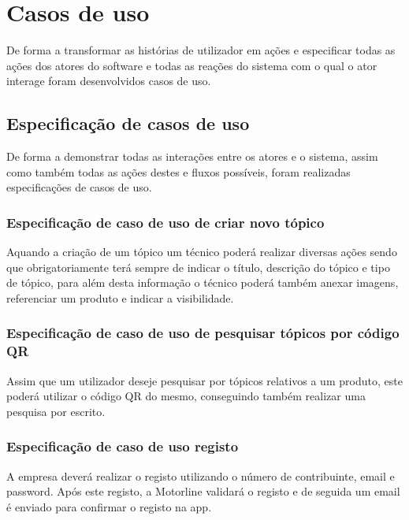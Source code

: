 \section{Casos de uso}
De forma a transformar as histórias de utilizador em ações e especificar todas as ações dos atores do 
software e todas as reações do sistema com o qual o ator interage foram desenvolvidos casos de uso.


\newpage

\subsection{Especificação de casos de uso}

De forma a demonstrar todas as interações entre os atores e o sistema, assim como também todas as ações 
destes e fluxos possíveis, foram realizadas especificações de casos de uso.

\subsubsection{Especificação de caso de uso de criar novo tópico}

Aquando a criação de um tópico um técnico poderá realizar diversas ações sendo que obrigatoriamente 
terá sempre de indicar o título, descrição do tópico e tipo de tópico, para além desta informação o técnico poderá também
anexar imagens, referenciar um produto e indicar a visibilidade.



\subsubsection{Especificação de caso de uso de pesquisar tópicos por código QR}

Assim que um utilizador deseje pesquisar por tópicos relativos a um produto, este poderá utilizar 
o código QR do mesmo, conseguindo também realizar uma pesquisa por escrito.    



\subsubsection{Especificação de caso de uso registo}

A empresa deverá realizar o registo utilizando o número de contribuinte, email e password. Após este 
registo, a Motorline validará o registo e de seguida um email é enviado para confirmar o registo na app.


